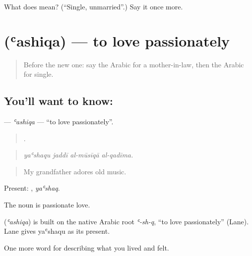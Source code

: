 \begin{tcolorbox}[breakable,colback=teal!4,colframe=teal!35!black,title={Before you move on}]
What does  mean? (\textquotedblleft{}Single, unmarried\textquotedblright{}.) Say it once more.
\end{tcolorbox}
\section[\texorpdfstring{\ar{عشق} (ʿashiqa)}{عشق (ʿashiqa)}]{ (ʿashiqa) — to love passionately}

\label{lesson:AR-C528-ashiqa}



\begin{quote}
Before the new one: say the Arabic for a mother-in-law, then the Arabic for single.
\end{quote}

\subsection*{You'll want to know: }
\textbf{} — \emph{ʿashiqa} — \textquotedblleft{}to love passionately\textquotedblright{}.

\begin{quote}
   .
\end{quote}

\begin{quote}
\emph{yaʿshaqu jaddī al-mūsīqā al-qadīma.}
\end{quote}

\begin{quote}
My grandfather adores old music.
\end{quote}

Present: , \emph{yaʿshaq}.

The noun  is passionate love.

\begin{cousinweb}
\textbf{} (\emph{ʿashiqa}) is built on the native Arabic root \emph{ʿ-sh-q}, \textquotedblleft{}to love passionately\textquotedblright{} (Lane). Lane gives yaʿshaqu as its present.
\end{cousinweb}

\begin{grammarlens}[title={What you've built}]
One more word for describing what you lived and felt.
\end{grammarlens}

